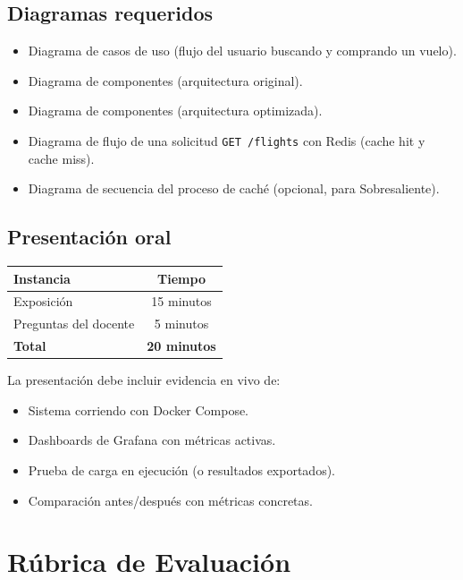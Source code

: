 \documentclass[12pt,a4paper]{article}
\begin{document}
\subsection{Diagramas requeridos}

\begin{itemize}
  \item Diagrama de casos de uso (flujo del usuario buscando y comprando un vuelo).
  \item Diagrama de componentes (arquitectura original).
  \item Diagrama de componentes (arquitectura optimizada).
  \item Diagrama de flujo de una solicitud \texttt{GET /flights} con Redis (cache hit y cache miss).
  \item Diagrama de secuencia del proceso de caché (opcional, para Sobresaliente).
\end{itemize}

\subsection{Presentación oral}

\begin{center}
\begin{tabular}{|l|c|}
\hline
\textbf{Instancia}     & \textbf{Tiempo} \\
\hline
Exposición              & 15 minutos \\
Preguntas del docente  & 5 minutos \\
\hline
\textbf{Total}          & \textbf{20 minutos} \\
\hline
\end{tabular}
\end{center}

La presentación debe incluir evidencia en vivo de:

\begin{itemize}
  \item Sistema corriendo con Docker Compose.
  \item Dashboards de Grafana con métricas activas.
  \item Prueba de carga en ejecución (o resultados exportados).
  \item Comparación antes/después con métricas concretas.
\end{itemize}

\newpage

\section{Rúbrica de Evaluación}
\end{document}
